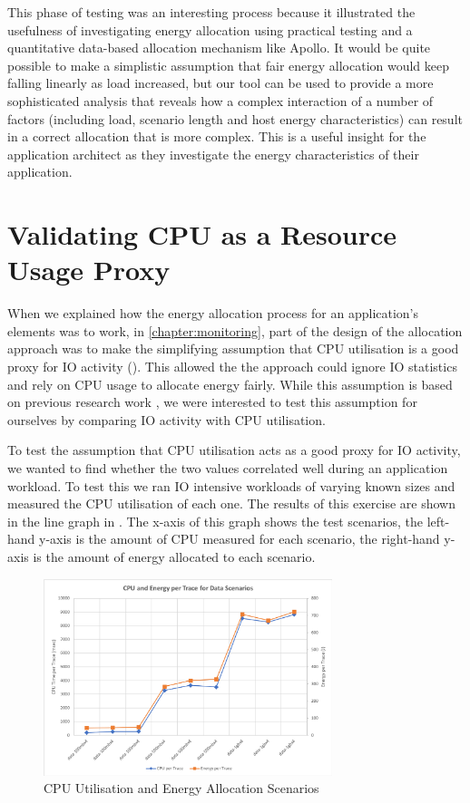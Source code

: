This phase of testing was an interesting process because it illustrated the usefulness of investigating energy allocation using practical testing and a quantitative data-based allocation mechanism like Apollo.  It would be quite possible to make a simplistic assumption that fair energy allocation would keep falling linearly as load increased, but our tool can be used to provide a more sophisticated analysis that reveals how a complex interaction of a number of factors (including load, scenario length and host energy characteristics) can result in a correct allocation that is more complex.  This is a useful insight for the application architect as they investigate the energy characteristics of their application.

\section{Validating CPU as a Resource Usage Proxy}

When we explained how the energy allocation process for an application's elements was to work, in \cref{chapter:monitoring}, part of the design of the allocation approach was to make the simplifying assumption that CPU utilisation is a good proxy for IO activity ().  This allowed the the approach could ignore IO statistics and rely on CPU usage to allocate energy fairly.  While this assumption is based on previous research work \cite{bashroush2018_hardwarerefresh} , we were interested to test this assumption for ourselves by comparing IO activity with CPU utilisation.

To test the assumption that CPU utilisation acts as a good proxy for IO activity, we wanted to find whether the two values correlated well during an application workload.  To test this we ran IO intensive workloads of varying known sizes and measured the CPU utilisation of each one.  The results of this exercise are shown in the line graph in .  The x-axis of this graph shows the test scenarios, the left-hand y-axis is the amount of CPU measured for each scenario, the right-hand y-axis is the amount of energy allocated to each scenario.

\begin{figure}
\centering
\includegraphics[width=0.75\textwidth]{Figures/validation-traceenergydatasize}
\caption{CPU Utilisation and Energy Allocation Scenarios}
\label{figure:validation-traceenergydatasize}
\end{figure}

